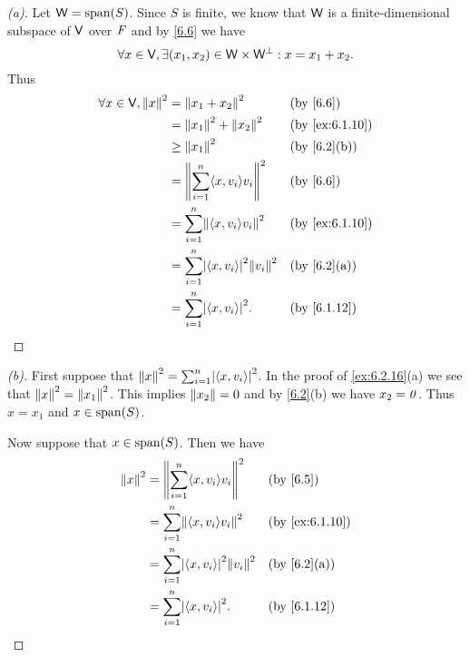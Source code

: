 \begin{proof}[(a)]
  Let \(\W = \spn{S}\).
  Since \(S\) is finite, we know that \(\mathsf{W}\) is a finite-dimensional subspace of \(\mathsf{V}\) over \(\mathit{F}\) and by \cref{6.6} we have
  \[
    \forall x \in \mathsf{V}, \exists (x_1, x_2) \in \mathsf{W} \times \mathsf{W}^{\perp} : x = x_1 + x_2.
  \]
  Thus
  \begin{align*}
    \forall x \in \V, \norm{x}^2 & = \norm{x_1 + x_2}^2                               &  & \text{(by \cref{6.6})}       \\
                                 & = \norm{x_1}^2 + \norm{x_2}^2                      &  & \text{(by \cref{ex:6.1.10})} \\
                                 & \geq \norm{x_1}^2                                  &  & \text{(by \cref{6.2}(b))}    \\
                                 & = \norm{\sum_{i = 1}^n \inn{x, v_i} v_i}^2         &  & \text{(by \cref{6.6})}       \\
                                 & = \sum_{i = 1}^n \norm{\inn{x, v_i} v_i}^2         &  & \text{(by \cref{ex:6.1.10})} \\
                                 & = \sum_{i = 1}^n \abs{\inn{x, v_i}}^2 \norm{v_i}^2 &  & \text{(by \cref{6.2}(a))}    \\
                                 & = \sum_{i = 1}^n \abs{\inn{x, v_i}}^2.             &  & \text{(by \cref{6.1.12})}
  \end{align*}
\end{proof}

\begin{proof}[(b)]
  First suppose that \(\norm{x}^2 = \sum_{i = 1}^n \abs{\inn{x, v_i}}^2\).
  In the proof of \cref{ex:6.2.16}(a) we see that \(\left\lVert x\right\rVert^2 = \left\lVert x_1\right\rVert^2\).
  This implies \(\left\lVert x_2\right\rVert = 0\) and by \cref{6.2}(b) we have \(x_2 = \mathit{0}\).
  Thus \(x = x_1\) and \(x \in \spn{S}\).

  Now suppose that \(x \in \spn{S}\).
  Then we have
  \begin{align*}
    \norm{x}^2 & = \norm{\sum_{i = 1}^n \inn{x, v_i} v_i}^2         &  & \text{(by \cref{6.5})}       \\
               & = \sum_{i = 1}^n \norm{\inn{x, v_i} v_i}^2         &  & \text{(by \cref{ex:6.1.10})} \\
               & = \sum_{i = 1}^n \abs{\inn{x, v_i}}^2 \norm{v_i}^2 &  & \text{(by \cref{6.2}(a))}    \\
               & = \sum_{i = 1}^n \abs{\inn{x, v_i}}^2.             &  & \text{(by \cref{6.1.12})}
  \end{align*}
\end{proof}

